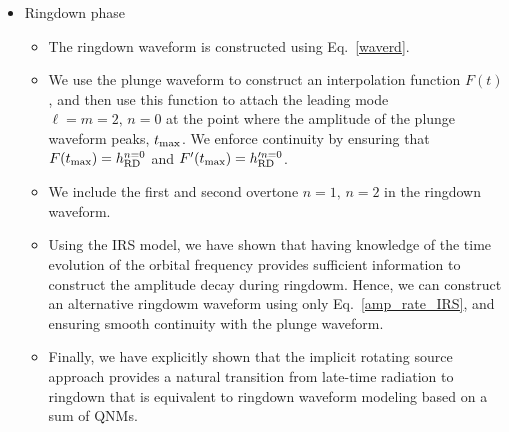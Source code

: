\begin{itemize}
\item{Ringdown phase}
\begin{itemize}
\item The ringdown waveform is constructed using Eq.~\eqref{waverd}.
\item We use the plunge waveform to construct an interpolation function \(F(t)\), and then use this function to attach the leading mode \(\ell=m=2,\, n=0\) at the point where the amplitude of the plunge waveform peaks, \(t_{\rm{max}}\). We enforce continuity by ensuring that \(F( t_{\rm{max}}) = h^{n=0}_{\rm{RD}}\) and  \(F'( t_{\rm{max}}) = h'^{n=0}_{\rm{RD}}\).
\item We include the first and second overtone \(n=1,\, n=2\) in the ringdown waveform.
\item  Using the IRS model, we have shown that having knowledge of the time evolution of the orbital frequency provides sufficient information to construct the amplitude decay during ringdowm. Hence, we can construct an alternative ringdowm waveform using only Eq.~\eqref{amp_rate_IRS}, and ensuring smooth continuity with the plunge waveform. 
\item Finally, we have explicitly shown that the implicit rotating source approach provides a natural transition from late-time radiation to ringdown that is equivalent to ringdown waveform modeling based on a sum of QNMs.
\end{itemize}
\end{itemize}

